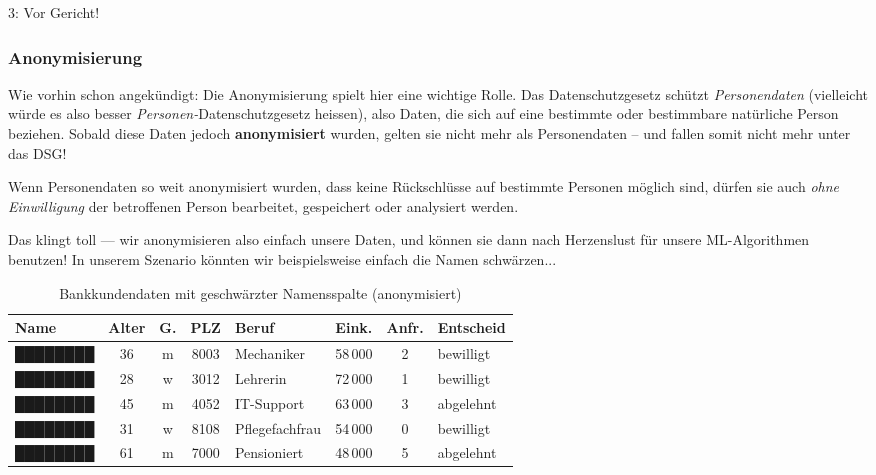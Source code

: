 \begin{lpu}
\begin{aufgabe}{3: Vor Gericht!}
\end{aufgabe}

\subsubsection*{Anonymisierung}
Wie vorhin schon angekündigt: Die Anonymisierung spielt hier eine wichtige Rolle. Das Datenschutzgesetz schützt \emph{Personendaten} (vielleicht würde es also besser \textit{Personen-}Datenschutzgesetz heissen), also Daten, die sich auf eine bestimmte oder bestimmbare natürliche Person beziehen. Sobald diese Daten jedoch \textbf{anonymisiert} wurden, gelten sie nicht mehr als Personendaten – und fallen somit nicht mehr unter das DSG!

\begin{theorie}
Wenn Personendaten so weit anonymisiert wurden, dass keine Rückschlüsse auf bestimmte Personen möglich sind, dürfen sie auch \emph{ohne Einwilligung} der betroffenen Person bearbeitet, gespeichert oder analysiert werden.
\end{theorie}

Das klingt toll — wir anonymisieren also einfach unsere Daten, und können sie dann nach Herzenslust für unsere ML-Algorithmen benutzen! In unserem Szenario könnten wir beispielsweise einfach die Namen schwärzen...

\begin{table}[h!]
\centering
\begin{tabular}{|l|c|c|c|l|c|c|l|}
\hline
\textbf{Name} & \textbf{Alter} & \textbf{G.} & \textbf{PLZ} & \textbf{Beruf} & \textbf{Eink.} & \textbf{Anfr.} & \textbf{Entscheid} \\
\hline
\cellcolor{black!20}████████ & 36 & m & 8003 & Mechaniker      & 58\,000 & 2 & bewilligt \\
\cellcolor{black!20}████████ & 28 & w & 3012 & Lehrerin        & 72\,000 & 1 & bewilligt \\
\cellcolor{black!20}████████ & 45 & m & 4052 & IT-Support      & 63\,000 & 3 & abgelehnt \\
\cellcolor{black!20}████████ & 31 & w & 8108 & Pflegefachfrau  & 54\,000 & 0 & bewilligt \\
\cellcolor{black!20}████████ & 61 & m & 7000 & Pensioniert     & 48\,000 & 5 & abgelehnt \\
\hline
\end{tabular}
\caption{Bankkundendaten mit geschwärzter Namensspalte (anonymisiert)}
\end{table}


\end{lpu}
